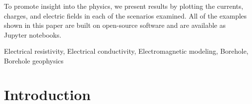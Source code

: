 \documentclass[extra,mreferee]{gji}
\begin{document}
\begin{summary}
To promote insight into the physics, we present results by plotting the currents, charges, and electric fields in each of the scenarios examined. All of the examples shown in this paper are built on open-source software and are available as Jupyter notebooks.


\end{summary}

\begin{keywords}
Electrical resistivity, Electrical conductivity, Electromagnetic modeling, Borehole, Borehole geophysics
\end{keywords}


\section{Introduction}
\end{document}
